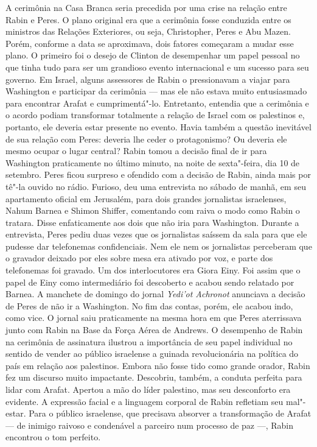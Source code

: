 A cerimônia na Casa Branca seria precedida por uma crise na relação
entre Rabin e Peres. O plano original era que a cerimônia fosse
conduzida entre os ministros das Relações Exteriores, ou seja,
Christopher, Peres e Abu Mazen. Porém, conforme a data se aproximava,
dois fatores começaram a mudar esse plano. O primeiro foi o desejo de
Clinton de desempenhar um papel pessoal no que tinha tudo para ser um
grandioso evento internacional e um sucesso para seu governo. Em Israel,
alguns assessores de Rabin o pressionavam a viajar para Washington e
participar da cerimônia --- mas ele não estava muito entusiasmado para
encontrar Arafat e cumprimentá"-lo. Entretanto, entendia que a cerimônia e o
acordo podiam transformar totalmente a relação de Israel com os
palestinos e, portanto, ele deveria estar presente no evento. Havia também a questão
inevitável de sua relação com Peres: deveria lhe ceder o protagonismo?
Ou deveria ele mesmo ocupar o lugar central? Rabin tomou a decisão final de
ir para Washington praticamente no último minuto, na
noite de sexta"-feira, dia 10 de setembro. Peres ficou surpreso e
ofendido com a decisão de Rabin, ainda mais por tê"-la ouvido no rádio.
Furioso, deu uma entrevista no sábado de manhã, em seu apartamento
oficial em Jerusalém, para dois grandes jornalistas israelenses, Nahum
Barnea e Shimon Shiffer, comentando com raiva o modo como Rabin o
tratara. Disse enfaticamente aos dois que não iria para Washington.
Durante a entrevista, Peres pediu duas vezes que os jornalistas saíssem
da sala para que ele pudesse dar telefonemas confidenciais. Nem ele nem
os jornalistas perceberam que o gravador deixado por eles sobre mesa era
ativado por voz, e parte dos telefonemas foi gravado. Um dos
interlocutores era Giora Einy. Foi assim que o papel de Einy como
intermediário foi descoberto e acabou sendo relatado por Barnea. A
manchete de domingo do jornal \emph{Yedi'ot Achronot} anunciava a
decisão de Peres de não ir a Washington. No fim das contas, porém, ele
acabou indo, como vice. O jornal saiu praticamente na mesma hora em que
Peres aterrissava junto com Rabin na Base da Força Aérea de Andrews. O
desempenho de Rabin na cerimônia de assinatura ilustrou a importância de
seu papel individual no sentido de vender ao público israelense a
guinada revolucionária na política do país em relação aos palestinos.
Embora não fosse tido como grande orador, Rabin fez um discurso muito
impactante. Descobriu, também, a conduta perfeita para lidar com Arafat.
Apertou a mão do líder palestino, mas seu desconforto era evidente. A
expressão facial e a linguagem corporal de Rabin refletiam seu
mal"-estar. Para o público israelense, que precisava absorver a
transformação de Arafat --- de inimigo raivoso e condenável a parceiro
num processo de paz ---, Rabin encontrou o tom perfeito.

